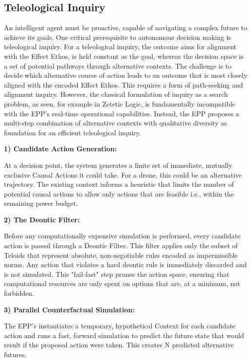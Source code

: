 \subsection{Teleological Inquiry}

An intelligent agent must be proactive, capable of navigating a complex future to achieve its goals. One critical prerequisite to autonomous decision making is teleological inquiry. For a teleological inquiry, the outcome aims for alignment with the Effect Ethos, is held constant as the goal, whereas the decision space is a set of potential pathways through alternative contexts. The challenge is to decide which alternative course of action leads to an outcome that is most closely aligned with the encoded Effect Ethos. This requires a form of path-seeking and alignment inquiry. However, the classical formulation of inquiry as a search problem, as seen, for example in Zetetic Logic\cite{Millson2020Zetetic}, is fundamentally incompatible with the EPP's real-time operational capabilities. Instead, the EPP proposes a multi-step combination of alternative contexts with qualitative diversity as foundation for an efficient teleological inquiry.\newline 

\textbf{1) Candidate Action Generation:}

At a decision point, the system generates a finite set of immediate, mutually exclusive Causal Actions it could take. For a drone, this could be an alternative trajectory. The existing context informs a heuristic that limits the number of potential causal actions to allow only actions that are feasible i.e., within the remaining power budget.\newline

\textbf{2) The Deontic Filter:}

Before any computationally expensive simulation is performed, every candidate action is passed through a Deontic Filter. This filter applies only the subset of Teloids that represent absolute, non-negotiable rules encoded as impermissible norms. Any action that violates a hard deontic rule is immediately discarded and is not simulated. This "fail-fast" step prunes the action space, ensuring that computational resources are only spent on options that are, at a minimum, not forbidden.

\textbf{3) Parallel Counterfactual Simulation:}

The EPP's instantiates a temporary, hypothetical Context for each candidate action and runs a fast, forward simulation to predict the future state that would result if the proposed action were taken. This creates N predicted alternative futures.\newline

